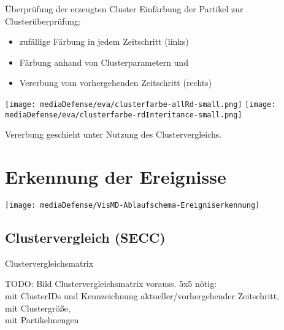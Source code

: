 \documentclass[10pt]{beamer}
\begin{document}
%
%
\begin{frame}{Überprüfung der erzeugten Cluster}
	Einfärbung der Partikel zur Clusterüberprüfung:
	\begin{itemize}
		\item zufällige Färbung in jedem Zeitschritt (links)
		\item Färbung anhand von Clusterparametern und
		\item Vererbung vom vorhergehenden Zeitschritt (rechts)
	\end{itemize}
	
	\texttt{[image: mediaDefense/eva/clusterfarbe-allRd-small.png]}
	\texttt{[image: mediaDefense/eva/clusterfarbe-rdInteritance-small.png]}
	
	Vererbung geschieht unter Nutzung des Clustervergleichs. %
\end{frame}

\section{Erkennung der Ereignisse}

%
%
\begin{wideframe}
	\texttt{[image: mediaDefense/VisMD-Ablaufschema-Ereigniserkennung]}
\end{wideframe}

\subsection{Clustervergleich (SECC)}

%
%
\begin{frame}{Clustervergleichsmatrix}

	TODO: Bild Clustervergleichsmatrix vorauss. 5x5 nötig:\\
	mit ClusterIDs und Kennzeichnung aktueller/vorhergehender Zeitschritt,\\
	mit Clustergröße,\\
	mit Partikelmengen

\end{frame}
\end{document}
